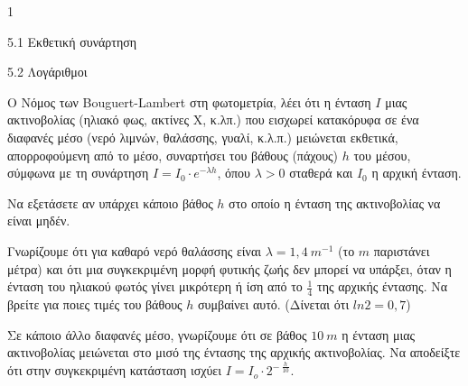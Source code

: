 \begin{ylh}{1}
\item 5.1 Εκθετική συνάρτηση
\item 5.2 Λογάριθμοι
\end{ylh}
Ο Νόμος των Bouguert-Lambert στη φωτομετρία, λέει ότι η ένταση $Ι$ μιας ακτινοβολίας (ηλιακό φως, ακτίνες Χ, κ.λπ.) που εισχωρεί κατακόρυφα σε ένα διαφανές μέσο (νερό λιμνών, θαλάσσης, γυαλί, κ.λ.π.) μειώνεται εκθετικά, απορροφούμενη από το μέσο, συναρτήσει του βάθους (πάχους) $h$ του μέσου, σύμφωνα με τη συνάρτηση $I = I_{0} \cdot e^{- \lambda h}$, όπου $\lambda > 0$ σταθερά και $Ι_{0}$ η αρχική ένταση.
\begin{alist}
\item Να εξετάσετε αν υπάρχει κάποιο βάθος $h$ στο οποίο η ένταση της ακτινοβολίας να είναι μηδέν.
\item Γνωρίζουμε ότι για καθαρό νερό θαλάσσης είναι $\lambda = 1,4\ m^{- 1}$ (το $m$ παριστάνει μέτρα) και ότι μια συγκεκριμένη μορφή φυτικής ζωής δεν μπορεί να υπάρξει, όταν η ένταση του ηλιακού φωτός γίνει μικρότερη ή ίση από το $\frac{1}{4}$ της αρχικής έντασης. Να βρείτε για ποιες τιμές του βάθους $h$ συμβαίνει αυτό. (Δίνεται ότι $ln2 = 0,7$)
\item Σε κάποιο άλλο διαφανές μέσο, γνωρίζουμε ότι σε βάθος $10\ m$ η ένταση μιας ακτινοβολίας μειώνεται στο μισό της έντασης της αρχικής ακτινοβολίας. Να αποδείξτε ότι στην συγκεκριμένη κατάσταση ισχύει $I = I_{o} \cdot 2^{- \ \frac{h}{10}}$.
\end{alist}

